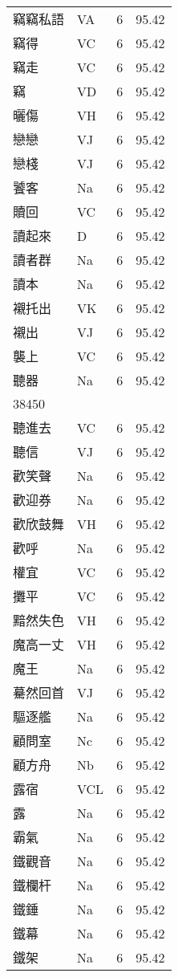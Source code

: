 \documentclass[twocolumn]{book}
\begin{document}
\begin{supertabular}{llrr}
竊竊私語 & VA & 6 &  95.42\\
竊得 & VC & 6 &  95.42\\
竊走 & VC & 6 &  95.42\\
竊 & VD & 6 &  95.42\\
曬傷 & VH & 6 &  95.42\\
戀戀 & VJ & 6 &  95.42\\
戀棧 & VJ & 6 &  95.42\\
饕客 & Na & 6 &  95.42\\
贖回 & VC & 6 &  95.42\\
讀起來 & D & 6 &  95.42\\
讀者群 & Na & 6 &  95.42\\
讀本 & Na & 6 &  95.42\\
襯托出 & VK & 6 &  95.42\\
襯出 & VJ & 6 &  95.42\\
襲上 & VC & 6 &  95.42\\
聽器 & Na & 6 &  95.42\\
38450\\
聽進去 & VC & 6 &  95.42\\
聽信 & VJ & 6 &  95.42\\
歡笑聲 & Na & 6 &  95.42\\
歡迎券 & Na & 6 &  95.42\\
歡欣鼓舞 & VH & 6 &  95.42\\
歡呼 & Na & 6 &  95.42\\
權宜 & VC & 6 &  95.42\\
攤平 & VC & 6 &  95.42\\
黯然失色 & VH & 6 &  95.42\\
魔高一丈 & VH & 6 &  95.42\\
魔王 & Na & 6 &  95.42\\
驀然回首 & VJ & 6 &  95.42\\
驅逐艦 & Na & 6 &  95.42\\
顧問室 & Nc & 6 &  95.42\\
顧方舟 & Nb & 6 &  95.42\\
露宿 & VCL & 6 &  95.42\\
露 & Na & 6 &  95.42\\
霸氣 & Na & 6 &  95.42\\
鐵觀音 & Na & 6 &  95.42\\
鐵欄杆 & Na & 6 &  95.42\\
鐵錘 & Na & 6 &  95.42\\
鐵幕 & Na & 6 &  95.42\\
鐵架 & Na & 6 &  95.42\\

\end{supertabular}
\end{document}
